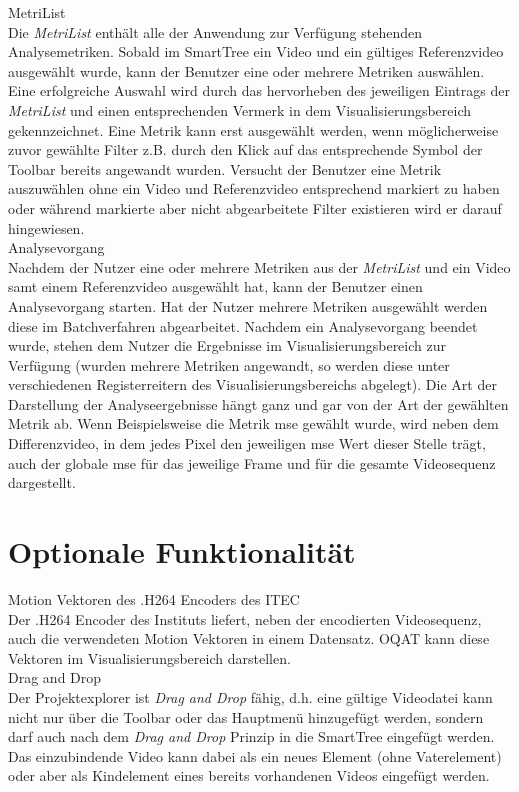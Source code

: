 %
 MetriList\\
Die \emph{MetriList} enthält alle der Anwendung zur Verfügung stehenden Analysemetriken.
Sobald im SmartTree ein Video und ein gültiges Referenzvideo ausgewählt wurde, kann der Benutzer
eine oder mehrere Metriken auswählen. Eine erfolgreiche Auswahl wird durch das hervorheben des
jeweiligen Eintrags der \emph{MetriList} und einen entsprechenden Vermerk in dem Visualisierungsbereich
gekennzeichnet. Eine Metrik kann erst ausgewählt werden, wenn möglicherweise zuvor gewählte Filter
z.B. durch den Klick auf das entsprechende Symbol der Toolbar bereits angewandt wurden. Versucht
der Benutzer eine Metrik auszuwählen ohne ein Video und Referenzvideo entsprechend markiert zu haben oder
während markierte aber nicht abgearbeitete Filter existieren wird er darauf hingewiesen.\\
 Analysevorgang \\
Nachdem der Nutzer eine oder mehrere Metriken aus der \emph{MetriList} und ein
Video samt einem Referenzvideo ausgewählt hat, kann der Benutzer einen Analysevorgang starten. Hat der
Nutzer mehrere Metriken ausgewählt werden diese im Batchverfahren abgearbeitet. Nachdem ein Analysevorgang
beendet wurde, stehen dem Nutzer die Ergebnisse im Visualisierungsbereich zur Verfügung (wurden 
mehrere Metriken angewandt, so werden diese unter verschiedenen Registerreitern des Visualisierungsbereichs
abgelegt). Die Art der Darstellung der Analyseergebnisse hängt ganz und gar von der Art der gewählten 
Metrik ab. Wenn Beispielsweise die Metrik \gls{mse} gewählt wurde, wird neben dem Differenzvideo, in dem jedes Pixel den jeweiligen \gls{mse} Wert dieser Stelle trägt, auch der globale \gls{mse} für das jeweilige Frame und für die gesamte Videosequenz dargestellt.

\section{Optionale Funktionalität}
\setcounter{counterKriterien}{0}
 Motion Vektoren des .H264 Encoders des \gls{ITEC}\\
Der .H264 Encoder des Instituts liefert, neben der encodierten Videosequenz, auch die verwendeten Motion
Vektoren in einem Datensatz. \gls{OQAT} kann diese Vektoren im Visualisierungsbereich darstellen.\\
 Drag and Drop\\
Der Projektexplorer ist \emph{Drag and Drop} fähig, d.h. eine gültige Videodatei kann nicht nur über
die Toolbar oder das Hauptmenü hinzugefügt werden, sondern darf auch nach dem \emph{Drag and Drop} Prinzip
in die SmartTree eingefügt werden. Das einzubindende Video kann dabei als ein neues Element (ohne
Vaterelement) oder aber als Kindelement eines bereits vorhandenen Videos eingefügt werden.
